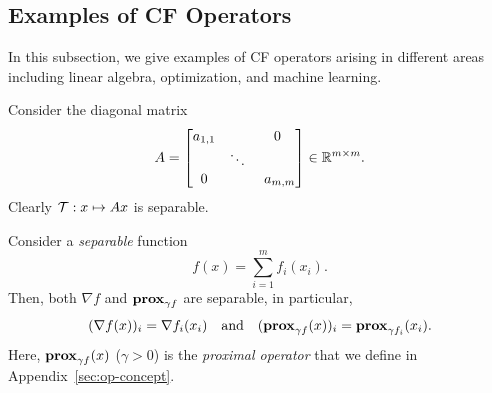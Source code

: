 \subsection{Examples of CF Operators}\label{sec:exp-cuf}
In this subsection, we give  examples of CF operators arising in different areas including linear algebra, optimization, and machine learning.
\begin{example}\label{exp:diagmat}
Consider the diagonal matrix
$$A = \begin{bmatrix}a_{1,1} & ~ & 0 \\  & \ddots&  \\ 0& ~& ~a_{m,m}\end{bmatrix}\in\RR^{m\times m}.$$
Clearly ${\mathcal{T}}:x\mapsto Ax$ is separable.
\end{example}
\begin{example}
Consider a \emph{separable} function
$$f(x) = \sum_{i=1}^m f_i(x_i).$$
Then, both $\nabla f$ and $\mathbf{prox}_{\gamma f}$ are separable, in particular,
$$(\nabla f(x))_i = \nabla f_i (x_i) \quad \mbox{and}\quad (\mathbf{prox}_{\gamma f}(x))_i= \mathbf{prox}_{\gamma f_i} (x_i).$$
Here, $\mathbf{prox}_{\gamma f} (x)$ ($\gamma >0$) is the \emph{proximal operator} that we  define in Appendix~\ref{sec:op-concept}. %
\end{example}

